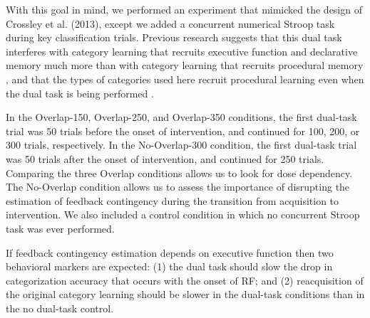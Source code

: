 \documentclass[apacite,draftfirst,man]{apa6}
\begin{document}

With this goal in mind, we performed an experiment that mimicked the design of
Crossley et al. (2013), except we added a concurrent numerical Stroop task
during key classification trials. Previous research suggests that this dual task
interferes with category learning that recruits executive function and
declarative memory much more than with category learning that recruits
procedural memory \cite{WaldronAshby2001, crossley2016declarative}, and that the
types of categories used here recruit procedural learning even when the dual
task is being performed \cite{crossley2016declarative}.

In the Overlap-150, Overlap-250, and Overlap-350 conditions, the first dual-task
trial was 50 trials before the onset of intervention, and continued for 100,
200, or 300 trials, respectively. In the No-Overlap-300 condition, the first
dual-task trial was 50 trials after the onset of intervention, and continued for
250 trials. Comparing the three Overlap conditions allows us to look for dose
dependency. The No-Overlap condition allows us to assess the importance of
disrupting the estimation of feedback contingency during the transition from
acquisition to intervention. We also included a control condition in which no
concurrent Stroop task was ever performed.


If feedback contingency estimation depends on executive function then two
behavioral markers are expected: (1) the dual task should slow the drop in
categorization accuracy that occurs with the onset of RF; and (2) reacquisition
of the original category learning should be slower in the dual-task conditions
than in the no dual-task control.
\end{document}
